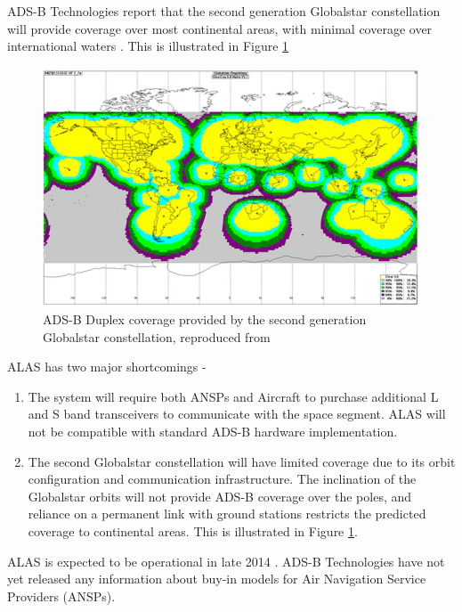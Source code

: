 ADS-B Technologies report that the second generation Globalstar constellation will provide coverage over most continental areas, with minimal coverage over international waters \cite{ADS-B:Globalstar_webinar}. This is illustrated in Figure
\ref{fig:globalstar_adsb}
\begin{figure}[H]
	\centering
	\includegraphics[scale = 0.7]{Pictures/globalstar_asdb.jpg}
	
	\caption[ADS-B Duplex coverage provided by the second generation Globalstar constellation]{ADS-B Duplex coverage provided by the second generation Globalstar constellation, reproduced from \cite{ADS-B:Globalstar_webinar}}
	\label{fig:globalstar_adsb}
\end{figure} 

ALAS has two major shortcomings -
\begin{enumerate}
	\item The system will require both ANSPs and Aircraft to purchase additional L and S band transceivers to communicate with the space segment. ALAS will not be compatible with standard ADS-B hardware implementation. 
	\item The second Globalstar constellation will have limited coverage due to its orbit configuration and communication infrastructure. The inclination of the Globalstar orbits will not provide ADS-B coverage over the poles, and reliance on a permanent link with ground stations restricts the predicted coverage to continental areas. This is illustrated in Figure \ref{fig:globalstar_adsb}.
\end{enumerate}

ALAS is expected to be operational in late 2014 \cite{ADS-B:Globalstar_webinar}. ADS-B Technologies have not yet released any information about buy-in models for Air Navigation Service Providers (ANSPs).

